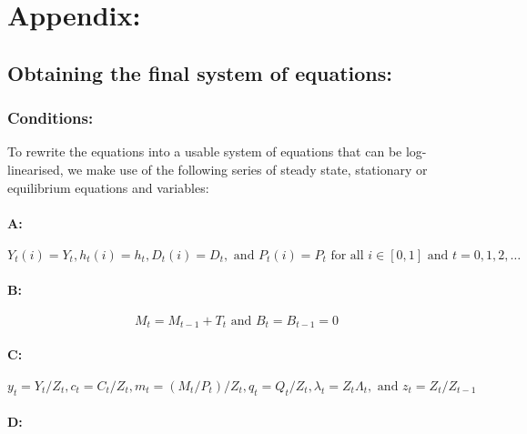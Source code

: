 \documentclass[11pt,preprint, authoryear]{elsarticle}
\numberwithin{equation}{section}
\numberwithin{figure}{section}
\numberwithin{table}{section}
\begin{document}
\newpage

\hypertarget{appendix}{%
\section{Appendix:}\label{appendix}}

\hypertarget{obtaining-the-final-system-of-equations}{%
\subsection{Obtaining the final system of
equations:}\label{obtaining-the-final-system-of-equations}}

\hypertarget{conditions}{%
\subsubsection{Conditions:}\label{conditions}}

To rewrite the equations into a usable system of equations that can be
log-linearised, we make use of the following series of steady state,
stationary or equilibrium equations and variables:

\hypertarget{a}{%
\paragraph{A:}\label{a}}

\[Y_{t}(i)=Y_{t}, h_{t}(i)=h_{t}, D_{t}(i)=D_{t}, \text { and } P_{t}(i)=P_{t} \text { for all } i \in[0,1] \text { and } t=0,1,2, \ldots\]

\hypertarget{b}{%
\paragraph{B:}\label{b}}

\[M_{t}=M_{t-1}+T_{t} \text { and } B_{t}=B_{t-1}=0\]

\hypertarget{c}{%
\paragraph{C:}\label{c}}

\[y_{t}=Y_{t} / Z_{t}, c_{t}=C_{t} / Z_{t}, m_{t}=\left(M_{t} / P_{t}\right) / Z_{t}, q_{t}=Q_{t} / Z_{t}, \lambda_{t}=Z_{t} \Lambda_{t}, \text { and } z_{t}=Z_{t} / Z_{t-1}\]

\hypertarget{d}{%
\paragraph{D:}\label{d}}
\end{document}
